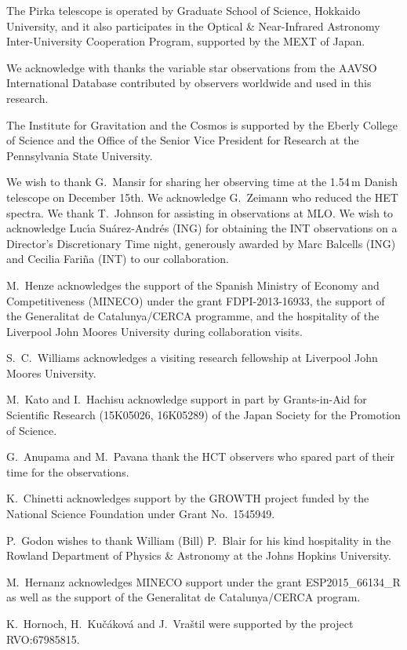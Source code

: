 \documentclass[twocolumn,tighten]{aastex6}
\begin{document}
The Pirka telescope is operated by Graduate School of Science, Hokkaido University, and it also participates in the Optical \& Near-Infrared Astronomy Inter-University Cooperation Program, supported by the MEXT of Japan.

We acknowledge with thanks the variable star observations from the AAVSO International Database contributed by observers worldwide and used in this research.

The Institute for Gravitation and the Cosmos is supported by the Eberly College of Science and the Office of the Senior Vice President for Research at the Pennsylvania State University.

We wish to thank G.\ Mansir for sharing her observing time at the 1.54\,m Danish telescope on December 15th. We acknowledge G.\ Zeimann who reduced the HET spectra. We thank T.\ Johnson for assisting in observations at MLO. We wish to acknowledge Luc\'\i a Su\'arez-Andr\'es  (ING) for obtaining the INT observations on a Director's Discretionary Time night, generously awarded by Marc Balcells (ING) and Cecilia Fari\~na (INT) to our collaboration. 

M.\ Henze acknowledges the support of the Spanish Ministry of Economy and Competitiveness (MINECO) under the grant FDPI-2013-16933, the support of the Generalitat de Catalunya/CERCA programme, and the hospitality of the Liverpool John Moores University during collaboration visits.

S.~C.\ Williams acknowledges a visiting research fellowship at Liverpool John Moores University. 

M.\ Kato and I.\ Hachisu acknowledge support in part by Grants-in-Aid for Scientific Research (15K05026, 16K05289) of the Japan Society for the Promotion of Science. 

G.\ Anupama and M.\ Pavana thank the HCT observers who spared part of their time for the observations.

K.\ Chinetti acknowledges support by the GROWTH project funded by the National Science Foundation under Grant No.\ 1545949.

P.\ Godon wishes to thank William (Bill) P.\ Blair for his kind hospitality in the Rowland Department of Physics \& Astronomy at the Johns Hopkins University.

M.\ Hernanz acknowledges MINECO support under the grant ESP2015\_66134\_R as well as the support of the Generalitat de Catalunya/CERCA program.

K.\ Hornoch, H.\ Ku\v{c}\'akov\'a and J.\ Vra\v{s}til were supported by the project RVO:67985815.
\end{document}
